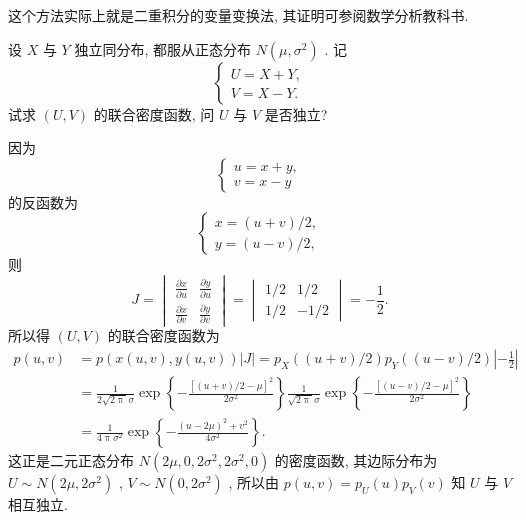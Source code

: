     这个方法实际上就是二重积分的变量变换法, 其证明可参阅数学分析教科书.
    \begin{example}\label{exam:3.3.9}
    	设 $X$ 与 $Y$ 独立同分布, 都服从正态分布 $N(\mu,\sigma^2)$ . 记
    	\begin{equation*}
    		\begin{cases}
    		U=X+Y,\\
    		V=X-Y.
    		\end{cases}
    	\end{equation*}
    	试求 $(U,V)$ 的联合密度函数, 问 $U$ 与 $V$ 是否独立?
    	\begin{solution}
    		因为
    		\begin{equation*}
    			\begin{cases}
    			u=x+y,\\
    			v=x-y
    			\end{cases}
    		\end{equation*}
    		的反函数为
    		\begin{equation*}
    			\begin{cases}
    			x=(u+v)/2,\\
    			y=(u-v)/2,
    			\end{cases}
    		\end{equation*}
    		则
    		\begin{equation*}
    			J=
    			\begin{vmatrix}
    			\frac{\partial x}{\partial u} & \frac{\partial y}{\partial u}\\
    			\frac{\partial x}{\partial v} & \frac{\partial y}{\partial v}
    			\end{vmatrix}
    			=
    			\begin{vmatrix}
    			1/2 & 1/2\\
    			1/2 & -1/2
    			\end{vmatrix}
    			=-\frac{1}{2}.
    		\end{equation*}
    		所以得 $(U,V)$ 的联合密度函数为
    		\begin{align*}
    			p(u,v)&=p(x(u,v),y(u,v))|J|=p_{X}((u+v)/2)p_{Y}((u-v)/2)\left|-\frac{1}{2}\right|\\
    			&=\frac{1}{2\sqrt{2\uppi}\sigma}\exp\left\{-\frac{[(u+v)/2-\mu]^2}{2\sigma^2}\right\}\frac{1}{\sqrt{2\uppi}\sigma}\exp\left\{-\frac{[(u-v)/2-\mu]^2}{2\sigma^2}\right\}\\
    			&=\frac{1}{4\uppi\sigma^2}\exp\left\{-\frac{(u-2\mu)^2+v^2}{4\sigma^2}\right\}.
    		\end{align*}
    		这正是二元正态分布 $N(2\mu,0,2\sigma^2,2\sigma^2,0)$ 的密度函数, 其边际分布为 $U\sim N(2\mu,2\sigma^2)$ , $V\sim N(0,2\sigma^2)$ , 所以由 $p(u,v)=p_{U}(u)p_{V}(v)$ 知 $U$ 与 $V$ 相互独立.
    	\end{solution}
    \end{example}
